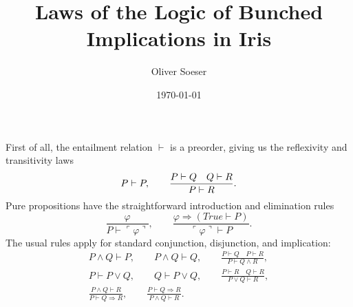 \documentclass[12pt]{article}
\title{Laws of the Logic of Bunched Implications in Iris}
\author{Oliver Soeser}
\date{\today}
\newcommand{\ent}{\vdash}
\renewcommand{\phi}{\varphi}
\newcommand{\pure}[1]{\ulcorner #1 \urcorner}
\newcommand{\imp}{\Rightarrow}
\begin{document}
\maketitle

First of all, the entailment relation $\ent$ is a preorder, giving us the reflexivity and transitivity laws
\begin{equation*}
  P \ent P, \qquad \frac{P \ent Q \quad Q \ent R}{P\ent R}.\\
\end{equation*}
Pure propositions have the straightforward introduction and elimination rules
\begin{equation*}
  \frac{\phi}{P \ent \pure\phi},\qquad \frac{\phi \imp  (True \ent P)}{\pure\phi \ent P}.
\end{equation*}
The usual rules apply for standard conjunction, disjunction, and implication:
\begin{align*}
  P \land Q \ent P,\qquad P \land Q \ent Q, \qquad \frac{P\ent Q\quad P\ent R}{P\ent Q\land R},\\
  P \ent P \lor Q,\qquad Q \ent P \lor Q,\qquad \frac{P\ent R\quad Q\ent R}{P\lor Q\ent R},\\
  \frac{P\land Q\ent R}{P \ent Q\imp R},\qquad\frac{P\ent Q\imp R}{P \land Q \ent R}.
\end{align*}
\end{document}
